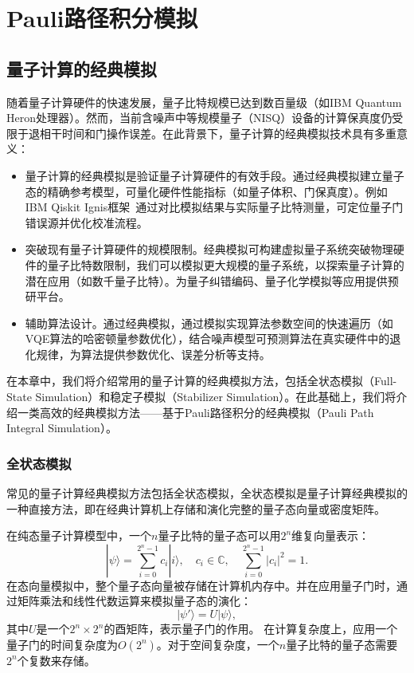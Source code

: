 \chapter{Pauli路径积分模拟}



\section{量子计算的经典模拟}
随着量子计算硬件的快速发展，量子比特规模已达到数百量级（如IBM Quantum Heron处理器）。然而，当前含噪声中等规模量子（NISQ）设备的计算保真度仍受限于退相干时间和门操作误差。在此背景下，量子计算的经典模拟技术具有多重意义：
\begin{itemize}
    \item 量子计算的经典模拟是验证量子计算硬件的有效手段。通过经典模拟建立量子态的精确参考模型，可量化硬件性能指标（如量子体积、门保真度）。例如IBM Qiskit Ignis框架~\cite{qiskit2024}通过对比模拟结果与实际量子比特测量，可定位量子门错误源并优化校准流程。
    \item 突破现有量子计算硬件的规模限制。经典模拟可构建虚拟量子系统突破物理硬件的量子比特数限制，我们可以模拟更大规模的量子系统，以探索量子计算的潜在应用（如数千量子比特）。为量子纠错编码、量子化学模拟等应用提供预研平台。
    \item 辅助算法设计。通过经典模拟，通过模拟实现算法参数空间的快速遍历（如VQE算法的哈密顿量参数优化），结合噪声模型可预测算法在真实硬件中的退化规律，为算法提供参数优化、误差分析等支持。
\end{itemize}
在本章中，我们将介绍常用的量子计算的经典模拟方法，包括全状态模拟（Full-State Simulation）和稳定子模拟（Stabilizer Simulation）。在此基础上，我们将介绍一类高效的经典模拟方法——基于Pauli路径积分的经典模拟（Pauli Path Integral Simulation）。


\subsection{全状态模拟}
常见的量子计算经典模拟方法包括全状态模拟，全状态模拟是量子计算经典模拟的一种直接方法，即在经典计算机上存储和演化完整的量子态向量或密度矩阵。

在纯态量子计算模型中，一个$n$量子比特的量子态可以用$2^n$维复向量表示：
\begin{equation}
    |\psi\rangle = \sum_{i=0}^{2^n-1} c_i |i\rangle,
    \quad c_i \in \mathbb{C}, \quad \sum_{i=0}^{2^n-1} |c_i|^2 = 1.
\end{equation}
在态向量模拟中，整个量子态向量被存储在计算机内存中。并在应用量子门时，通过矩阵乘法和线性代数运算来模拟量子态的演化：
\begin{equation}
    |\psi'\rangle = U |\psi\rangle,
\end{equation}
其中$U$是一个$2^n \times 2^n$的酉矩阵，表示量子门的作用。
在计算复杂度上，应用一个量子门的时间复杂度为$O(2^n)$。对于空间复杂度，一个$n$量子比特的量子态需要$2^n$个复数来存储。

